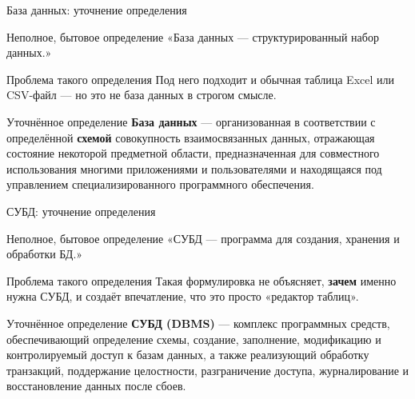\documentclass[aspectratio=169]{beamer}
\begin{document}
\begin{frame}{База данных: уточнение определения}

\begin{block}{Неполное, бытовое определение}
«База данных — структурированный набор данных.»
\end{block}

\vspace{0.2cm}

\begin{alertblock}{Проблема такого определения}
Под него подходит и обычная таблица Excel или CSV-файл —
но это не база данных в строгом смысле.
\end{alertblock}

\vspace{0.3cm}

\begin{block}{Уточнённое определение}
\textbf{База данных} — организованная в соответствии
с определённой \textbf{схемой} совокупность взаимосвязанных
данных, отражающая состояние некоторой предметной области,
предназначенная для совместного использования многими
приложениями и пользователями и находящаяся под управлением
специализированного программного обеспечения.
\end{block}

\end{frame}


\begin{frame}{СУБД: уточнение определения}

\begin{block}{Неполное, бытовое определение}
«СУБД — программа для создания, хранения и обработки БД.»
\end{block}

\vspace{0.2cm}

\begin{alertblock}{Проблема такого определения}
Такая формулировка не объясняет, \textbf{зачем} именно нужна
СУБД, и создаёт впечатление, что это просто «редактор таблиц».
\end{alertblock}

\vspace{0.3cm}

\begin{block}{Уточнённое определение}
\textbf{СУБД (DBMS)} — комплекс программных средств,
обеспечивающий определение схемы, создание, заполнение,
модификацию и контролируемый доступ к базам данных,
а также реализующий обработку транзакций, поддержание
целостности, разграничение доступа, журналирование
и восстановление данных после сбоев.
\end{block}

\end{frame}
\end{document}

